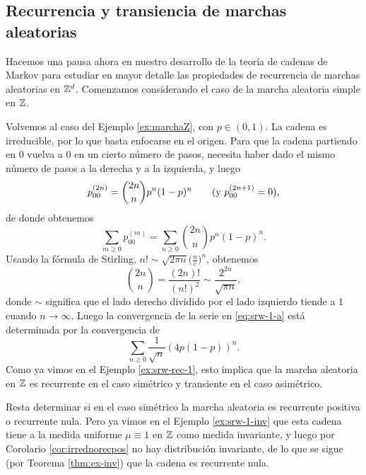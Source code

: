 \subsection{Recurrencia y transiencia de marchas aleatorias}

Hacemos una pausa ahora en nuestro desarrollo de la teoría de cadenas de Markov para estudiar en mayor detalle las propiedades de recurrencia de marchas aleatorias en $\mathbb{Z}^d$.
Comenzamos considerando el caso de la marcha aleatoria simple en $\mathbb{Z}$.

\begin{ex}\label{ex:srw-1-a}
Volvemos al caso del Ejemplo \ref{ex:marchaZ}, con $p\in(0,1)$.
La cadena es irreducible, por lo que basta enfocarse en el origen.
Para que la cadena partiendo en $0$ vuelva a $0$ en un cierto número de pasos, necesita haber dado el mismo número de pasos a la derecha y a la izquierda, y luego
\[p^{(2n)}_{00}={\binom{2n}{n}}p^n(1-p)^n\qquad\text{\upshape{(y }}p^{(2n+1)}_{00}=0\text{\upshape{)}},\]
de donde obtenemos
\begin{equation}
\sum_{m\geq0}p^{(m)}_{00}=\sum_{n\geq0}{\binom{2n}{n}}p^n(1-p)^n.\label{eq:srw-1-a}
\end{equation}
Usando la fórmula de Stirling, $n!\sim\sqrt{2\pi n}\big(\frac{n}{e}\big)^n$, obtenemos 
\[{\binom{2n}{n}}=\frac{(2n)!}{(n!)^2}\sim\frac{2^{2n}}{\sqrt{\pi n}},\]
donde $\sim$ significa que el lado derecho dividido por el lado izquierdo tiende a $1$ cuando $n\to\infty$.
Luego la convergencia de la serie en \eqref{eq:srw-1-a} está determinada por la convergencia de
\[\sum_{n\geq0}\frac{1}{\sqrt{n}}(4p(1-p))^n.\]
Como ya vimos en el Ejemplo \ref{ex:srw-rec-1}, esto implica que la marcha aleatoria en $\mathbb{Z}$ es recurrente en el caso simétrico y transiente en el caso asimétrico.

\noindent Resta determinar si en el caso simétrico la marcha aleatoria es recurrente positiva o recurrente nula.
Pero ya vimos en el Ejemplo \ref{ex:srw-1-inv} que esta cadena tiene a la medida uniforme $\mu\equiv1$ en $\mathbb{Z}$ como medida invariante, y luego por Corolario \ref{cor:irrednorecpos} no hay distribución invariante, de lo que se sigue (por Teorema \ref{thm:ex-inv}) que la cadena es recurrente nula.
\end{ex}

